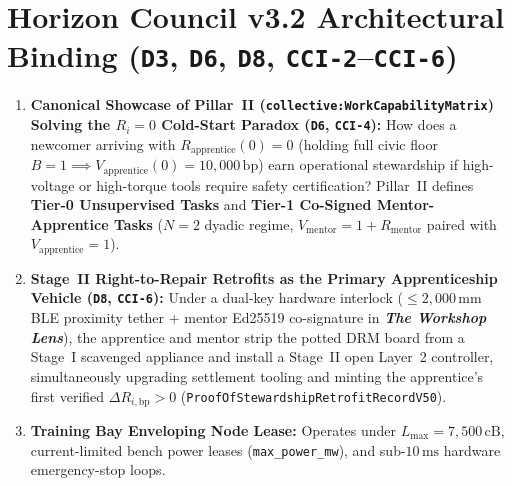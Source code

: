 \section{Horizon Council v3.2 Architectural Binding (\texttt{D3}, \texttt{D6}, \texttt{D8}, \texttt{CCI-2}--\texttt{CCI-6})}
\begin{enumerate}
    \item \textbf{Canonical Showcase of Pillar~II (\texttt{collective:WorkCapabilityMatrix}) Solving the $R_i = 0$ Cold-Start Paradox (\texttt{D6}, \texttt{CCI-4}):} How does a newcomer arriving with $R_{\mathrm{apprentice}}(0) = 0$ (holding full civic floor $B = 1 \implies V_{\mathrm{apprentice}}(0) = 10{,}000\,\mathrm{bp}$) earn operational stewardship if high-voltage or high-torque tools require safety certification? Pillar~II defines \textbf{Tier-0 Unsupervised Tasks} and \textbf{Tier-1 Co-Signed Mentor-Apprentice Tasks} ($N=2$ dyadic regime, $V_{\mathrm{mentor}} = 1 + R_{\mathrm{mentor}}$ paired with $V_{\mathrm{apprentice}} = 1$).
    \item \textbf{Stage~II Right-to-Repair Retrofits as the Primary Apprenticeship Vehicle (\texttt{D8}, \texttt{CCI-6}):} Under a dual-key hardware interlock ($\le 2{,}000\,\mathrm{mm}$ BLE proximity tether + mentor Ed25519 co-signature in \textbf{\textit{The Workshop Lens}}), the apprentice and mentor strip the potted DRM board from a Stage~I scavenged appliance and install a Stage~II open Layer~2 controller, simultaneously upgrading settlement tooling and minting the apprentice's first verified $\Delta R_{i,\mathrm{bp}} > 0$ (\texttt{ProofOfStewardshipRetrofitRecordV50}).
    \item \textbf{Training Bay Enveloping Node Lease:} Operates under $L_{\max} = 7{,}500\,\mathrm{cB}$, current-limited bench power leases (\texttt{max\_power\_mw}), and sub-$10\,\mathrm{ms}$ hardware emergency-stop loops.
\end{enumerate}

